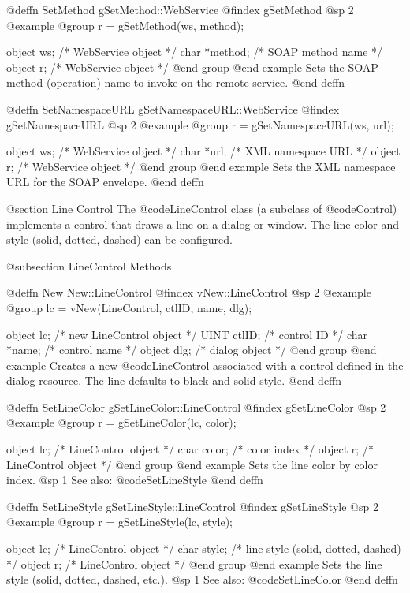 @deffn {SetMethod} gSetMethod::WebService
@findex gSetMethod
@sp 2
@example
@group
r = gSetMethod(ws, method);

object  ws;       /*  WebService object  */
char    *method;  /*  SOAP method name   */
object  r;        /*  WebService object  */
@end group
@end example
Sets the SOAP method (operation) name to invoke on the remote service.
@end deffn



@deffn {SetNamespaceURL} gSetNamespaceURL::WebService
@findex gSetNamespaceURL
@sp 2
@example
@group
r = gSetNamespaceURL(ws, url);

object  ws;    /*  WebService object       */
char    *url;  /*  XML namespace URL       */
object  r;     /*  WebService object       */
@end group
@end example
Sets the XML namespace URL for the SOAP envelope.
@end deffn




@section Line Control
The @code{LineControl} class (a subclass of @code{Control}) implements a
control that draws a line on a dialog or window.  The line color and
style (solid, dotted, dashed) can be configured.

@subsection LineControl Methods



@deffn {New} New::LineControl
@findex vNew::LineControl
@sp 2
@example
@group
lc = vNew(LineControl, ctlID, name, dlg);

object  lc;       /*  new LineControl object  */
UINT    ctlID;    /*  control ID              */
char    *name;    /*  control name            */
object  dlg;      /*  dialog object           */
@end group
@end example
Creates a new @code{LineControl} associated with a control defined in
the dialog resource.  The line defaults to black and solid style.
@end deffn



@deffn {SetLineColor} gSetLineColor::LineControl
@findex gSetLineColor
@sp 2
@example
@group
r = gSetLineColor(lc, color);

object  lc;     /*  LineControl object  */
char    color;  /*  color index         */
object  r;      /*  LineControl object  */
@end group
@end example
Sets the line color by color index.
@sp 1
See also:  @code{SetLineStyle}
@end deffn



@deffn {SetLineStyle} gSetLineStyle::LineControl
@findex gSetLineStyle
@sp 2
@example
@group
r = gSetLineStyle(lc, style);

object  lc;     /*  LineControl object       */
char    style;  /*  line style (solid, dotted, dashed)  */
object  r;      /*  LineControl object       */
@end group
@end example
Sets the line style (solid, dotted, dashed, etc.).
@sp 1
See also:  @code{SetLineColor}
@end deffn




